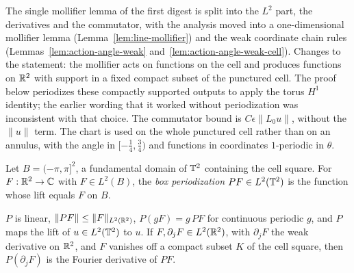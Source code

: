 \begin{remark}
The single mollifier lemma of the first digest is split into the $L^2$ part, the derivatives
and the commutator, with the analysis moved into a one-dimensional mollifier lemma
(Lemma~\ref{lem:line-mollifier}) and the weak coordinate chain rules
(Lemmas~\ref{lem:action-angle-weak} and~\ref{lem:action-angle-weak-cell}). Changes to the statement: the mollifier acts on functions
on the cell and produces functions on $\mathbb{R}^2$ with support in a fixed compact subset of the
punctured cell. The proof below periodizes these compactly supported
outputs to apply the torus $H^1$ identity; the earlier wording that it
worked without periodization was inconsistent with that choice.
The commutator bound is $C\epsilon\|L_0u\|$, without the $\|u\|$ term. The chart is used on the whole punctured cell rather than
on an annulus, with the angle in $[-\frac14,\frac34)$ and functions in coordinates $1$-periodic in
$\theta$.
\end{remark}

\begin{definition}
\label{def:box-periodization}
\leanok
Let $B=(-\pi,\pi]^2$, a fundamental domain of $\mathbb{T}^2$ containing the cell square. For
$F:\mathbb{R}^2\to\mathbb{C}$ with $F\in L^2(B)$, the \emph{box periodization} $PF\in L^2(\mathbb{T}^2)$ is the
function whose lift equals $F$ on $B$.
\end{definition}

\begin{lemma}
\label{lem:box-periodization}
\leanok
$P$ is linear, $\|PF\|\le\|F\|_{L^2(\mathbb{R}^2)}$, $P(gF)=g\,PF$ for continuous periodic $g$, and
$P$ maps the lift of $u\in L^2(\mathbb{T}^2)$ to $u$. If $F,\partial_jF\in L^2(\mathbb{R}^2)$, with
$\partial_jF$ the weak derivative on $\mathbb{R}^2$, and $F$ vanishes off a compact subset $K$ of the
cell square, then $P(\partial_jF)$ is the Fourier derivative of $PF$.
\end{lemma}

